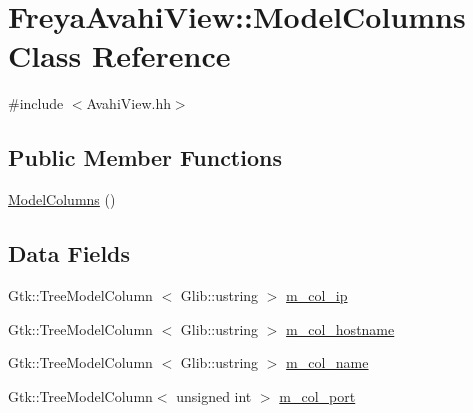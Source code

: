 \hypertarget{classFreyaAvahiView_1_1ModelColumns}{
\section{\-Freya\-Avahi\-View\-:\-:\-Model\-Columns \-Class \-Reference}
\label{classFreyaAvahiView_1_1ModelColumns}
}


{\ttfamily \#include $<$\-Avahi\-View.\-hh$>$}

\subsection*{\-Public \-Member \-Functions}
\begin{DoxyCompactItemize}
\item 
\hyperlink{classFreyaAvahiView_1_1ModelColumns_a2f30e067a5e509199feaefe67f29d604}{\-Model\-Columns} ()
\end{DoxyCompactItemize}
\subsection*{\-Data \-Fields}
\begin{DoxyCompactItemize}
\item 
\-Gtk\-::\-Tree\-Model\-Column\*
$<$ \-Glib\-::ustring $>$ \hyperlink{classFreyaAvahiView_1_1ModelColumns_a31c145fde36d80d79b144aafb2a7be74}{m\-\_\-col\-\_\-ip}
\item 
\-Gtk\-::\-Tree\-Model\-Column\*
$<$ \-Glib\-::ustring $>$ \hyperlink{classFreyaAvahiView_1_1ModelColumns_a502136679ff61fba3cb689a7ad58b76b}{m\-\_\-col\-\_\-hostname}
\item 
\-Gtk\-::\-Tree\-Model\-Column\*
$<$ \-Glib\-::ustring $>$ \hyperlink{classFreyaAvahiView_1_1ModelColumns_a27abc5ff6a5f24083aebf45292a1580b}{m\-\_\-col\-\_\-name}
\item 
\-Gtk\-::\-Tree\-Model\-Column$<$ unsigned \*
int $>$ \hyperlink{classFreyaAvahiView_1_1ModelColumns_ae40aed00696ff2d7d644eb62ef5930e1}{m\-\_\-col\-\_\-port}
\end{DoxyCompactItemize}


